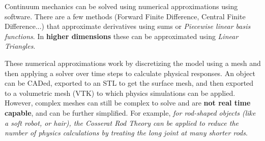 \documentclass[onecolumn,a4paper]{article}
\begin{document}
 Continuum mechanics can be solved using numerical approximations using software. There are a few methods (Forward Finite Difference, Central Finite Difference...) that approximate derivatives using sums or \emph{Piecewise linear basis functions}. In \textbf{higher dimensions} these can be approximated using \emph{Linear Triangles}.

 These numerical approximations work by discretizing the model using a mesh and then applying a solver over time steps to calculate physical responses. An object can be CADed, exported to an STL to get the surface mesh, and then exported to a volumetric mesh (VTK) to which physics simulations can be applied. However, complex meshes can still be complex to solve and are \textbf{not real time capable}, and can be further simplified. For example, \emph{for rod-shaped objects (like a soft robot, or hair), the Cosserat Rod Theory can be applied to reduce the number of physics calculations by treating the long joint at many shorter rods}.
\end{document}
